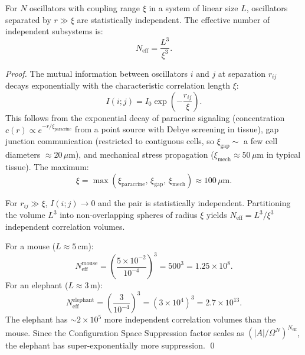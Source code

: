 \begin{theorem}
\label{thm:spatial_decorrelation}
For $N$ oscillators with coupling range $\xi$ in a system of linear size $L$,
oscillators separated by $r \gg \xi$ are statistically independent. The effective
number of independent subsystems is:
\begin{equation}
  N_{\mathrm{eff}} = \frac{L^3}{\xi^3}.
  \label{eq:n_eff}
\end{equation}
\end{theorem}

\begin{proof}
The mutual information between oscillators $i$ and $j$ at separation $r_{ij}$
decays exponentially with the characteristic correlation length $\xi$:
\begin{equation}
  I(i; j) = I_0 \exp\!\left(-\frac{r_{ij}}{\xi}\right).
  \label{eq:mi_decay}
\end{equation}
This follows from the exponential decay of paracrine signaling (concentration
$c(r) \propto e^{-r/\xi_{\mathrm{paracrine}}}$ from a point source with Debye
screening in tissue), gap junction communication (restricted to contiguous cells,
so $\xi_{\mathrm{gap}} \sim$ a few cell diameters $\approx 20\,\mu\mathrm{m}$),
and mechanical stress propagation ($\xi_{\mathrm{mech}} \approx 50\,\mu\mathrm{m}$
in typical tissue). The maximum:
\begin{equation}
  \xi = \max(\xi_{\mathrm{paracrine}},\, \xi_{\mathrm{gap}},\, \xi_{\mathrm{mech}})
  \approx 100\,\mu\mathrm{m}.
\end{equation}

For $r_{ij} \gg \xi$, $I(i;j) \to 0$ and the pair is statistically independent.
Partitioning the volume $L^3$ into non-overlapping spheres of radius $\xi$ yields
$N_{\mathrm{eff}} = L^3 / \xi^3$ independent correlation volumes.

For a mouse ($L \approx 5\,\mathrm{cm}$):
\begin{equation}
  N_{\mathrm{eff}}^{\mathrm{mouse}} = \left(\frac{5 \times 10^{-2}}{10^{-4}}\right)^3
  = 500^3 = 1.25 \times 10^8.
\end{equation}
For an elephant ($L \approx 3\,\mathrm{m}$):
\begin{equation}
  N_{\mathrm{eff}}^{\mathrm{elephant}} = \left(\frac{3}{10^{-4}}\right)^3
  = (3 \times 10^4)^3 = 2.7 \times 10^{13}.
\end{equation}
The elephant has $\sim 2 \times 10^5$ more independent correlation volumes than
the mouse. Since the Configuration Space Suppression factor scales as
$(|A|/\Omega^N)^{N_{\mathrm{eff}}}$, the elephant has super-exponentially more
suppression. \qed
\end{proof}

